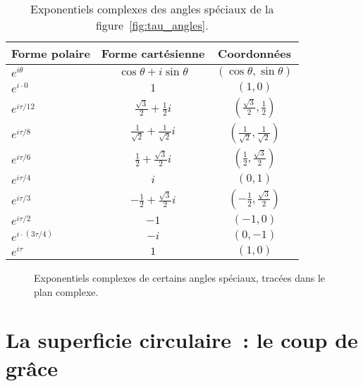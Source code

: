 \begin{table}
\begin{center}
\begin{tabular}{lcc}
Forme polaire & Forme cartésienne & Coordonnées \\ \hline\hline
$e^{i\theta}$ & $\cos\theta + i\sin\theta$ & $(\cos\theta, \sin\theta)$ \\ \hline
$e^{i\cdot0}$ & $1$ & $(1, 0)$ \smallskip \\
$e^{i\tau/12}$ & $\frac{\sqrt{3}}{2} + \frac{1}{2}i$ & $(\frac{\sqrt{3}}{2}, \frac{1}{2})$ \smallskip \\
$e^{i\tau/8}$ & $\frac{1}{\sqrt{2}} +  \frac{1}{\sqrt{2}}i$ & $(\frac{1}{\sqrt{2}}, \frac{1}{\sqrt{2}})$ \smallskip \\
$e^{i\tau/6}$ & $\frac{1}{2} +\frac{\sqrt{3}}{2} i$ & $(\frac{1}{2}, \frac{\sqrt{3}}{2})$ \smallskip \\
$e^{i\tau/4}$ & $i$ & $(0, 1)$ \smallskip \\
$e^{i\tau/3}$ & $-\frac{1}{2} +\frac{\sqrt{3}}{2} i$ & $(-\frac{1}{2}, \frac{\sqrt{3}}{2})$ \smallskip \\
$e^{i\tau/2}$ & $-1$ & $(-1, 0)$ \smallskip \\
$e^{i\cdot(3\tau/4)}$ & $-i$ & $(0, -1)$ \smallskip \\
$e^{i\tau}$ & $1$ & $(1, 0)$
\end{tabular}
\end{center}
\caption{Exponentiels complexes des angles spéciaux de la
figure~\ref{fig:tau_angles}.\label{table:complex_exponentials}}
\end{table}

\begin{figure}
\begin{center}
\end{center}
\caption{Exponentiels complexes de certains angles spéciaux, tracées dans le
plan complexe.\label{fig:tau_euler_circle}}
\end{figure}


\section{La superficie circulaire~: le coup de grâce} %
\label{sec:circular_area}

